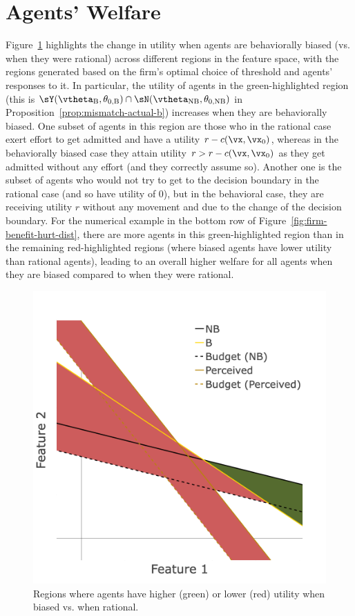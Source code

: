 \section{Agents' Welfare}\label{app:welfare}
Figure~\ref{fig:SW-regions} highlights the change in utility when agents are behaviorally biased (vs. when they were rational) across different regions in the feature space, with the regions generated based on the firm's optimal choice of threshold and agents' responses to it. In particular, the utility of agents in the green-highlighted region (this is $\sY(\vtheta_\text{B}, \theta_{0,\text{B}}) \cap \sN(\vtheta_\text{NB}, \theta_{0,\text{NB}})$ in Proposition~\ref{prop:mismatch-actual-b}) increases when they are behaviorally biased. One subset of agents in this region are those 
who in the rational case exert effort to get admitted and have a utility $r-c(\vx,\vx_0)$, whereas in the behaviorally biased case they attain utility $r > r-c(\vx,\vx_0)$ as they get admitted without any effort (and they correctly assume so). Another one is %
the subset of agents who would not try to get to the decision boundary in the rational case (and so have utility of $0$), but in the behavioral case, they are receiving utility $r$ without any movement and due to the change of the decision boundary. For the numerical example in the bottom row of Figure~\ref{fig:firm-benefit-hurt-dist}, there are more agents in this green-highlighted region than in the remaining red-highlighted regions (where biased agents have lower utility than rational agents), leading to an overall higher welfare for all agents when they are biased compared to when they were rational. 

\begin{figure}[ht]
    \centering
    \includegraphics[width=0.4\linewidth]{Figures/SW_highlighted regions.png}
    \caption{Regions where agents have higher (green) or lower (red) utility when biased vs. when rational.}
    \label{fig:SW-regions}
\end{figure}